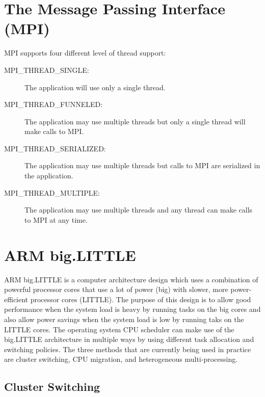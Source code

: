 \documentclass[11pt]{book}
\begin{document}

\section{The Message Passing Interface (MPI)}

MPI supports four different level of thread support:

\begin{description}

    \item[MPI\_THREAD\_SINGLE:] The application will use only a single thread.
    \item[MPI\_THREAD\_FUNNELED:] The application may use multiple threads but only a single thread
        will make calls to MPI.
    \item[MPI\_THREAD\_SERIALIZED:] The application may use multiple threads but calls to MPI
        are serialized in the application.
    \item[MPI\_THREAD\_MULTIPLE:] The application may use multiple threads and any thread can make
        calls to MPI at any time.

\end{description}


\section{ARM big.LITTLE}

ARM big.LITTLE is a computer architecture design which uses a combination of powerful processor cores
that use a lot of power (big) with slower, more power-efficient processor cores (LITTLE). The purpose
of this design is to allow good performance when the system load is heavy by running tasks on the big
cores and also allow power savings when the system load is low by running taks on the
LITTLE cores. The operating system CPU scheduler can make use of the big.LITTLE architecture in
multiple ways by using different task allocation and switching policies. The three methods that are
currently being used in practice are cluster switching, CPU migration, and heterogeneous
multi-processing.

\subsection{Cluster Switching}
\end{document}
